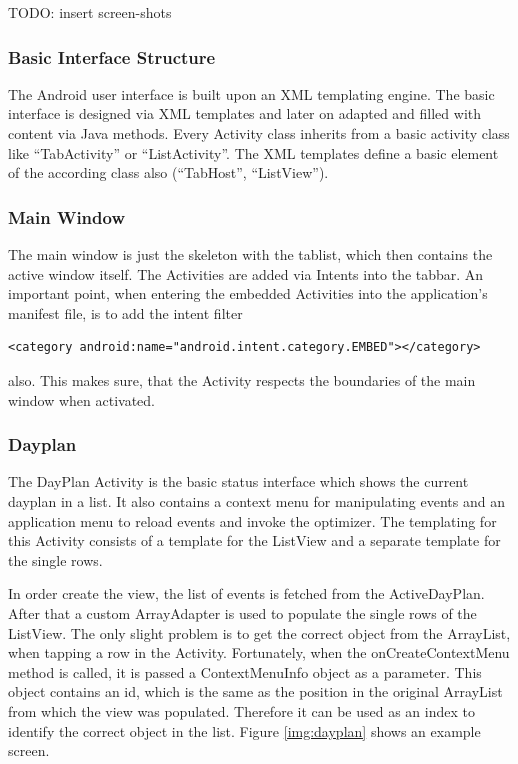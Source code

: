 TODO: insert screen-shots

\subsubsection{Basic Interface Structure} %
\label{ssub:Basic Interface Structure}
The Android user interface is built upon an XML templating engine.
The basic interface is designed via XML templates and later on adapted
and filled with content via Java methods. Every Activity class inherits
from a basic activity class like ``TabActivity'' or ``ListActivity''.
The XML templates define a basic element of the according class also
(``TabHost'', ``ListView'').


\subsubsection{Main Window} %
\label{ssub:MainWindow}

The main window is just the skeleton with the tablist, which then
contains the active window itself. The Activities are added
via Intents into the tabbar. An important point, when entering the embedded
Activities into the application's manifest file, is to add the intent filter
\begin{verbatim}
<category android:name="android.intent.category.EMBED"></category>
\end{verbatim}
also. This makes sure, that the Activity respects the boundaries of the
main window when activated.


\subsubsection{Dayplan} %
\label{ssub:Dayplan}
The DayPlan Activity is the basic status interface which shows the current
dayplan in a list. It also contains a context menu for manipulating events
and an application menu to reload events and invoke the optimizer. The
templating for this Activity consists of a template for the ListView and a
separate template for the single rows.

In order create the view, the list of events is fetched from the
ActiveDayPlan. After that a custom ArrayAdapter is used to populate the
single rows of the ListView.
The only slight problem is to get the correct object from the ArrayList,
when tapping a row in the Activity. Fortunately, when the onCreateContextMenu
method is called, it is passed a ContextMenuInfo object as a parameter. This
object contains an id, which is the same as the position in the original
ArrayList from which the view was populated. Therefore it can be used as an
index to identify the correct object in the list. Figure \ref{img:dayplan}
shows an example screen.

